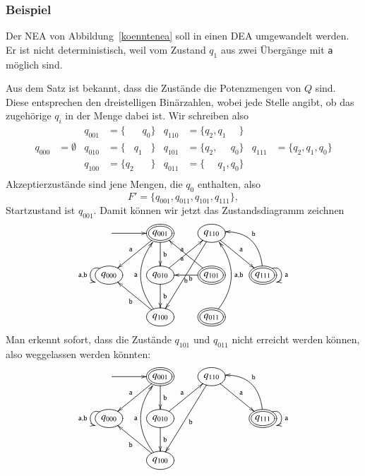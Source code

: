 \subsubsection{Beispiel}
Der NEA von Abbildung~\ref{koenntenea}
soll in einen DEA umgewandelt werden.
Er ist nicht deterministisch,
weil vom Zustand $q_1$ aus zwei Übergänge mit {\tt a} möglich sind.

Aus dem Satz ist bekannt, dass die Zustände die Potenzmengen von $Q$ sind.
Diese entsprechen den dreistelligen Binärzahlen, wobei jede
Stelle angibt, ob das zugehörige $q_i$ in der Menge dabei ist.
Wir
schreiben also
\begin{align*}
       &          &q_{001}&=\{\phantom{q_2q_1}q_0\}&q_{110}&=\{q_2,q_1\phantom{,q_0}\}&&\\
q_{000}&=\emptyset&q_{010}&=\{\phantom{q_2}q_1\phantom{q_0}\}&q_{101}&=\{q_2,\phantom{q_1,}q_0\}&q_{111}&=\{q_2,q_1,q_0\}\\
       &          &q_{100}&=\{q_2\phantom{q_1q_0}\}&q_{011}&=\{\phantom{q_2,}q_1,q_0\}&&\\
\end{align*}
Akzeptierzustände sind jene Mengen, die $q_0$ enthalten, also
\[
F'=\{ q_{001}, q_{011}, q_{101}, q_{111}\},
\]
Startzustand ist $q_{001}$.
Damit können wir jetzt das Zustandsdiagramm zeichnen
\[
\entrymodifiers={++[o][F]}
\xymatrix{
*+\txt{}\ar[r]
	&*++[o][F=]{q_{001}} \ar[d]^{\tt b}\ar[dl]_{\tt a}
		&{q_{110}}\ar[dr]^{\tt a} \ar[ddl]^{\tt b}
\\
{q_{000}}\ar@(ul,dl)_{{\tt a},{\tt b}}
	&{q_{010}} \ar[ur]^{\tt a} \ar[d]^{\tt b}
		&*++[o][F=]{q_{101}} \ar[ul]^{\tt a} \ar[l]^{\tt b}
			&*++[o][F=]{q_{111}}\ar@(ur,dr)^{{\tt a}} \ar@/_20pt/[ul]_{\tt b}
\\
*+\txt{}
	&{q_{100}}\ar@/^20pt/[uu]^{\tt a}  \ar[ul]^{\tt b}
		&*++[o][F=]{q_{011}} \ar@/_20pt/[uu]_{{\tt a},{\tt b}}
}
\]
Man erkennt sofort, dass die Zustände $q_{101}$ und $q_{011}$
nicht erreicht werden können, also weggelassen werden könnten:
\begin{equation}
\entrymodifiers={++[o][F]}
\xymatrix{
*+\txt{}\ar[r]
	&*++[o][F=]{q_{001}} \ar[d]^{\tt b}\ar[dl]_{\tt a}
		&{q_{110}}\ar[dr]^{\tt a} \ar[ddl]^{\tt b}
\\
{q_{000}}\ar@(ul,dl)_{{\tt a},{\tt b}}
	&{q_{010}} \ar[ur]^{\tt a} \ar[d]^{\tt b}
		&*+\txt{}
			&*++[o][F=]{q_{111}}\ar@(ur,dr)^{{\tt a}} \ar@/_20pt/[ul]_{\tt b}
\\
*+\txt{}
	&{q_{100}}\ar@/^20pt/[uu]^{\tt a}  \ar[ul]^{\tt b}
		&*+\txt{}
}
\label{nea-eps}
\end{equation}
